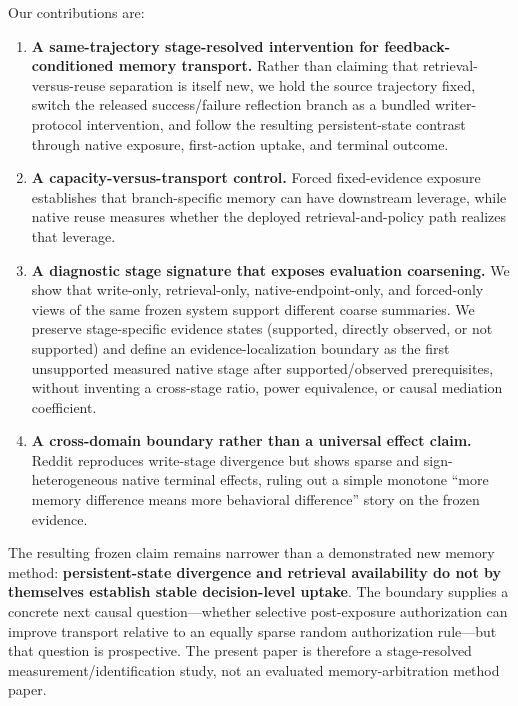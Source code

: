 Our contributions are:
\begin{enumerate}
    \item \textbf{A same-trajectory stage-resolved intervention for feedback-conditioned memory transport.} Rather than claiming that retrieval-versus-reuse separation is itself new, we hold the source trajectory fixed, switch the released success/failure reflection branch as a bundled writer-protocol intervention, and follow the resulting persistent-state contrast through native exposure, first-action uptake, and terminal outcome.
    \item \textbf{A capacity-versus-transport control.} Forced fixed-evidence exposure establishes that branch-specific memory can have downstream leverage, while native reuse measures whether the deployed retrieval-and-policy path realizes that leverage.
    \item \textbf{A diagnostic stage signature that exposes evaluation coarsening.} We show that write-only, retrieval-only, native-endpoint-only, and forced-only views of the same frozen system support different coarse summaries. We preserve stage-specific evidence states (supported, directly observed, or not supported) and define an evidence-localization boundary as the first unsupported measured native stage after supported/observed prerequisites, without inventing a cross-stage ratio, power equivalence, or causal mediation coefficient.
    \item \textbf{A cross-domain boundary rather than a universal effect claim.} Reddit reproduces write-stage divergence but shows sparse and sign-heterogeneous native terminal effects, ruling out a simple monotone ``more memory difference means more behavioral difference'' story on the frozen evidence.
\end{enumerate}

The resulting frozen claim remains narrower than a demonstrated new memory method: \textbf{persistent-state divergence and retrieval availability do not by themselves establish stable decision-level uptake}. The boundary supplies a concrete next causal question---whether selective post-exposure authorization can improve transport relative to an equally sparse random authorization rule---but that question is prospective. The present paper is therefore a stage-resolved measurement/identification study, not an evaluated memory-arbitration method paper.
